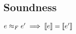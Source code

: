 \documentclass[10pt]{article}
\begin{document}
%

%
%
%
%
%
%


\subsection{Soundness}
\label{sec:TransSoundness}


\begin{theorem}
  $e \approx_F e' \implies \llbracket e\rrbracket = \llbracket e'\rrbracket$
\end{theorem}
\end{document}
